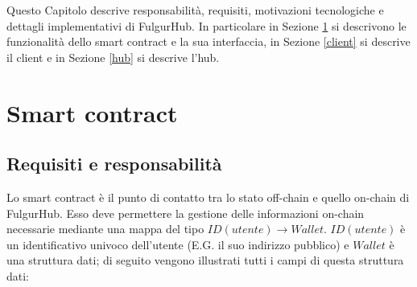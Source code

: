 \documentclass[12pt,italian,]{book}
\begin{document}
Questo Capitolo descrive responsabilità, requisiti, motivazioni tecnologiche e dettagli implementativi di FulgurHub. In particolare in Sezione \ref{smart-contract} si descrivono le funzionalità dello smart contract e la sua interfaccia, in Sezione \ref{client} si descrive il client e in Sezione \ref{hub} si descrive l'hub.

\hypertarget{smart-contract}{%
\section{Smart contract}\label{smart-contract}}

\hypertarget{requisiti-e-responsabilituxe0}{%
\subsection{Requisiti e responsabilità}\label{requisiti-e-responsabilituxe0}}

Lo smart contract è il punto di contatto tra lo stato off-chain e quello on-chain di FulgurHub. Esso deve permettere la gestione delle informazioni on-chain necessarie mediante una mappa del tipo \(ID(utente) \rightarrow Wallet\). \(ID(utente)\) è un identificativo univoco dell'utente (E.G. il suo indirizzo pubblico) e \(Wallet\) è una struttura dati; di seguito vengono illustrati tutti i campi di questa struttura dati:
\end{document}
